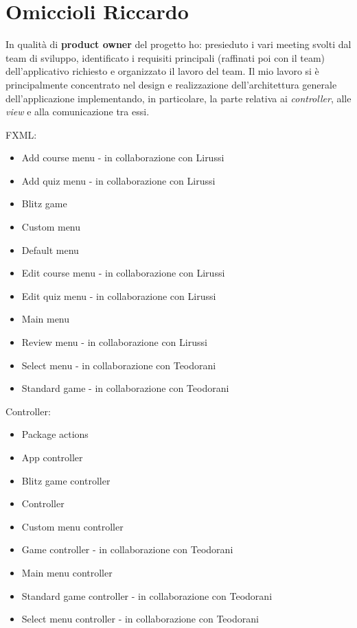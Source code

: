 \section{Omiccioli Riccardo}
   In qualità di \textbf{product owner} del progetto ho: presieduto i vari meeting svolti dal team di sviluppo, identificato i requisiti principali (raffinati poi con il team) dell'applicativo richiesto e organizzato il lavoro del team. Il mio lavoro si è principalmente concentrato nel design e realizzazione dell'architettura generale dell'applicazione implementando, in particolare, la parte relativa ai \textit{controller}, alle \textit{view} e alla comunicazione tra essi.
   
    FXML:
    \begin{itemize}
        \item Add course menu - in collaborazione con Lirussi
        \item Add quiz menu - in collaborazione con Lirussi
        \item Blitz game
        \item Custom menu
        \item Default menu
        \item Edit course menu - in collaborazione con Lirussi
        \item Edit quiz menu - in collaborazione con Lirussi
        \item Main menu
        \item Review menu - in collaborazione con Lirussi
        \item Select menu - in collaborazione con Teodorani
        \item Standard game - in collaborazione con Teodorani
    \end{itemize}
    Controller:
    \begin{itemize}
        \item Package actions
        \item App controller
        \item Blitz game controller
        \item Controller
        \item Custom menu controller
        \item Game controller - in collaborazione con Teodorani
        \item Main menu controller
        \item Standard game controller - in collaborazione con Teodorani
        \item Select menu controller - in collaborazione con Teodorani
    \end{itemize}
